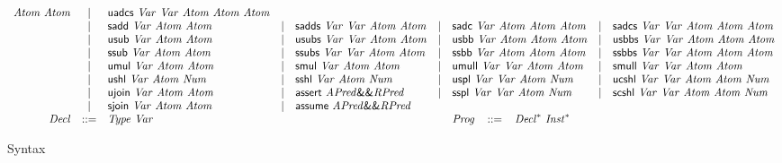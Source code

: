 \begin{figure*}
\begin{math}
\begin{array}{rclclclcl}
            \mathit{Atom}\ \mathit{Atom}
      & | & \clUAdcs\ \mathit{Var}\ \mathit{Var}\
            \mathit{Atom}\ \mathit{Atom}\ \mathit{Atom}\\
      & | & \clSAdd\ \mathit{Var}\ \mathit{Atom}\ \mathit{Atom}
      & | & \clSAdds\ \mathit{Var}\ \mathit{Var}\
            \mathit{Atom}\ \mathit{Atom}
      & | & \clSAdc\ \mathit{Var}\ \mathit{Atom}\
            \mathit{Atom}\ \mathit{Atom}
      & | & \clSAdcs\ \mathit{Var}\ \mathit{Var}\
            \mathit{Atom}\ \mathit{Atom}\ \mathit{Atom}\\
      & | & \clUSub\ \mathit{Var}\ \mathit{Atom}\ \mathit{Atom}
      & | & \clUSubs\ \mathit{Var}\ \mathit{Var}\
            \mathit{Atom}\ \mathit{Atom}
      & | & \clUSbb\ \mathit{Var}\ \mathit{Atom}\
            \mathit{Atom}\ \mathit{Atom}
      & | & \clUSbbs\ \mathit{Var}\ \mathit{Var}\
            \mathit{Atom}\ \mathit{Atom}\ \mathit{Atom}\\
      & | & \clSSub\ \mathit{Var}\ \mathit{Atom}\ \mathit{Atom}
      & | & \clSSubs\ \mathit{Var}\ \mathit{Var}\
            \mathit{Atom}\ \mathit{Atom}
      & | & \clSSbb\ \mathit{Var}\ \mathit{Atom}\
            \mathit{Atom}\ \mathit{Atom}
      & | & \clSSbbs\ \mathit{Var}\ \mathit{Var}\
            \mathit{Atom}\ \mathit{Atom}\ \mathit{Atom}\\
      & | & \clUMul\ \mathit{Var}\ \mathit{Atom}\ \mathit{Atom}
      & | & \clSMul\ \mathit{Var}\ \mathit{Atom}\ \mathit{Atom}
      & | & \clUMull\ \mathit{Var}\ \mathit{Var}\
            \mathit{Atom}\ \mathit{Atom}
      & | & \clSMull\ \mathit{Var}\ \mathit{Var}\
            \mathit{Atom}\ \mathit{Atom}\\
      & | & \clUShl\ \mathit{Var}\ \mathit{Atom}\ \mathit{Num}
      & | & \clSShl\ \mathit{Var}\ \mathit{Atom}\ \mathit{Num}
      & | & \clUSplit\ \mathit{Var}\ \mathit{Var}\
            \mathit{Atom}\ \mathit{Num}
      & | & \clUCShl\ \mathit{Var}\ \mathit{Var}\
            \mathit{Atom}\ \mathit{Atom}\ \mathit{Num}\\
      & | & \clUJoin\ \mathit{Var}\ \mathit{Atom}\ \mathit{Atom}
      & | & \clAssert\ \mathit{APred} \clConj \mathit{RPred}
      & | & \clSSplit\ \mathit{Var}\ \mathit{Var}\
            \mathit{Atom}\ \mathit{Num}
      & | & \clSCShl\ \mathit{Var}\ \mathit{Var}\
            \mathit{Atom}\ \mathit{Atom}\ \mathit{Num}\\
                     & | & \clSJoin\ \mathit{Var}\ \mathit{Atom}\ \mathit{Atom}
      & | & \clAssume\ \mathit{APred} \clConj \mathit{RPred}\\
      \mathit{Decl} & ::= &
        \multicolumn{3}{l}{\mathit{Type}\ \mathit{Var}}
      &&
      \multicolumn{3}{l}{
         \mathit{Prog} \hspace{2ex} ::=\hspace{2ex}
         \mathit{Decl}^*\ \mathit{Inst}^*
      }
    \end{array}
  \end{math}
  \caption{\cryptoline Syntax}
  \label{figure:cryptoline-syntax}
\end{figure*}
